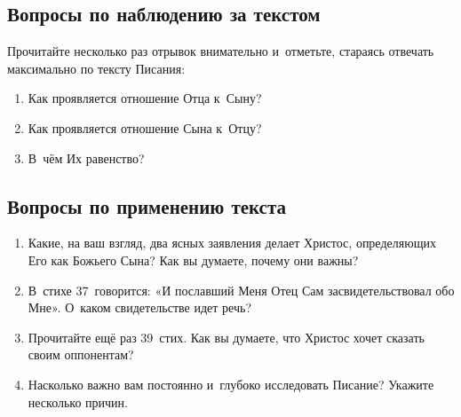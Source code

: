 \documentclass[a4paper,12pt]{article}
\begin{document}
\subsection*{Вопросы по наблюдению за текстом}
Прочитайте несколько раз отрывок внимательно и~отметьте, стараясь отвечать максимально по тексту Писания: 

\begin{enumerate}
    
    \item Как проявляется отношение Отца к~Сыну? 
    
    \myline
    
    \myline
    \item Как проявляется отношение Сына к~Отцу? 
    
    \myline
    
    \myline
    \item В~чём Их равенство? 
    
    \myline
    
    \myline
\end{enumerate}

\subsection*{Вопросы по применению текста} 
\begin{enumerate}
    \item Какие, на ваш взгляд, два ясных заявления делает Христос, определяющих Его как Божьего Сына? Как вы думаете, почему они важны?
    
    \myline
    
    \myline
    \item В~стихе 37~говорится: «И пославший Меня Отец Сам засвидетельствовал обо Мне». О~каком свидетельстве идет речь? 
    
    \myline
    
    \myline
    \item Прочитайте ещё раз 39~стих. Как вы думаете, что Христос хочет сказать своим оппонентам? 
    
    \myline
    
    \myline
    \item Насколько важно вам постоянно и~глубоко исследовать Писание? Укажите несколько причин.
    
    \myline
    
    \myline
\end{enumerate}

\end{document}
